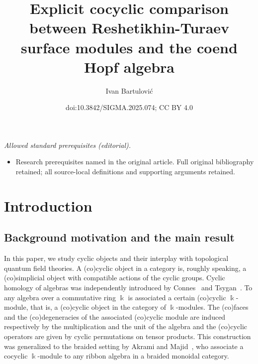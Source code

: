 \documentclass[10pt,a4paper]{amsart}
\title{Explicit cocyclic comparison between Reshetikhin-Turaev surface modules and the coend Hopf algebra}
\author{Ivan Bartulović}
\date{doi:10.3842/SIGMA.2025.074; CC BY 4.0}
\numberwithin{equation}{section}
\newcommand{\kk}{\Bbbk}
\begin{document}
\maketitle
\noindent\textit{Allowed standard prerequisites (editorial).}\begin{itemize}
\item Research prerequisites named in the original article. Full original bibliography retained; all source-local definitions and supporting arguments retained.
\end{itemize}\medskip
\section{Introduction}

\subsection{Background motivation and the main result} In this paper, we study cyclic objects and their interplay with topological quantum field theories.
A (co)cyclic object in a category is, roughly speaking, a (co)simplicial object with
compatible actions of the cyclic groups. Cyclic homology of algebras was independently introduced by Connes~\cite{connes_non-commutative_1985} and Tsygan~\cite{tsygan}. To any algebra over a commutative ring $\kk$ is associated a certain (co)cyclic $\kk$-module, that is, a (co)cyclic object in the category of $\kk$-modules. The (co)faces and the (co)degeneracies of the associated (co)cyclic module are induced respectively by the multiplication and the unit of the algebra and the (co)cyclic operators are given by cyclic permutations on tensor products.
This construction was generalized to the braided setting by Akrami and Majid~\cite{cycliccocycles}, who associate a cocyclic $\kk$-module to any ribbon algebra in a braided monoidal category.
\end{document}
